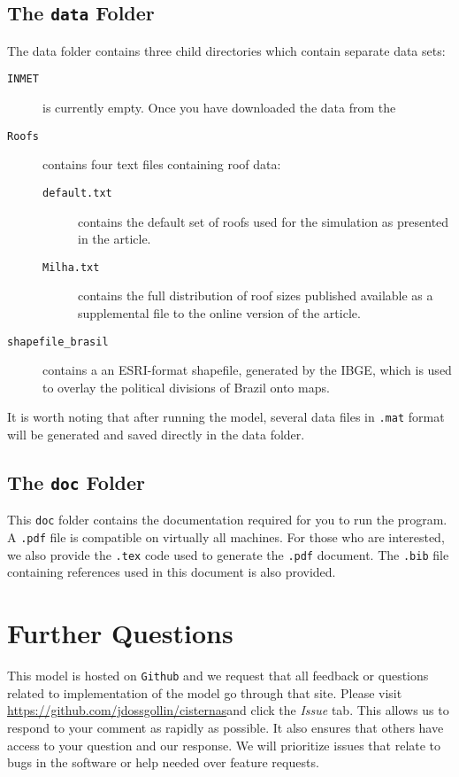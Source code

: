 \documentclass[11pt]{article} %
\newcommand{\fn}[1]{\texttt{#1}} %
\newcommand{\code}[1]{\texttt{#1}} %
\newcommand{\usee}[1]{\textit{#1}} %
\newcommand{\github}{\url{https://github.com/jdossgollin/cisternas}}
\begin{document}
\subsection{The \fn{data} Folder} \label{dfolder}
The data folder contains three child directories which contain separate data sets:
\begin{description}
\item[\fn{INMET}] is currently empty. Once you have downloaded the data from the \
\item[\fn{Roofs}] contains four text files containing roof data:
\begin{description}
\item[\fn{default.txt}] contains the default set of roofs used for the simulation as presented in the article.
\item[\fn{Milha.txt}] contains the full distribution of roof sizes published available as a supplemental file to the online version of the article.
\end{description}
\item[\fn{shapefile\_brasil}] contains a an ESRI-format shapefile, generated by the \ac{IBGE}, which is used to overlay the political divisions of Brazil onto maps.
\end{description}
It is worth noting that after running the model, several data files in \fn{.mat} format will be generated and saved directly in the data folder.

\subsection{The \fn{doc} Folder} \label{doc}
This \fn{doc} folder contains the documentation required for you to run the program.
A \code{.pdf} file is compatible on virtually all machines.
For those who are interested, we also provide the \code{.tex} code used to generate the \code{.pdf} document.
The \code{.bib} file containing references used in this document is also provided.


\section{Further Questions}

This model is hosted on \code{Github} and we request that all feedback or questions related to implementation of the model go through that site.
Please visit \github and click the \usee{Issue} tab.
This allows us to respond to your comment as rapidly as possible.
It also ensures that others have access to your question and our response.
We will prioritize issues that relate to bugs in the software or help needed over feature requests.
\end{document}
